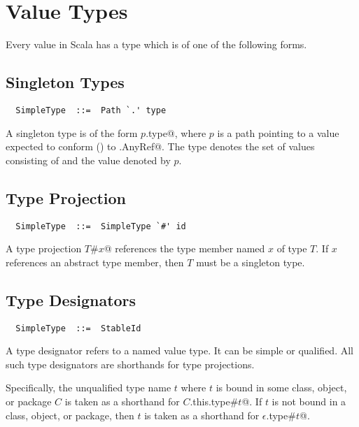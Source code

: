 \section{Value Types}\label{sec:value-types}

Every value in Scala has a type which is of one of the following
forms.

\subsection{Singleton Types}
\label{sec:singleton-type}

\syntax\begin{lstlisting}
  SimpleType  ::=  Path `.' type
\end{lstlisting}

A singleton type is of the form \lstinline@$p$.type@, where $p$ is a
path pointing to a value expected to conform ()
to \lstinline@scala.AnyRef@.  The type denotes the set of values
consisting of  and the value denoted by $p$. 

\subsection{Type Projection}
\label{sec:type-project}

\syntax\begin{lstlisting} 
  SimpleType  ::=  SimpleType `#' id
\end{lstlisting}

A type projection \lstinline@$T$#$x$@ references the type member named
$x$ of type $T$. If $x$ references an abstract type member, then $T$
must be a singleton type. 

\subsection{Type Designators}
\label{sec:type-desig}

\syntax\begin{lstlisting}
  SimpleType  ::=  StableId
\end{lstlisting}

A type designator refers to a named value type. It can be simple or
qualified. All such type designators are shorthands for type projections.

Specifically, the unqualified type name $t$ where $t$ is bound in some
class, object, or package $C$ is taken as a shorthand for
\lstinline@$C$.this.type#$t$@.  If $t$ is not bound in a class, object, or
package, then $t$ is taken as a shorthand for
\lstinline@$\epsilon$.type#$t$@.

